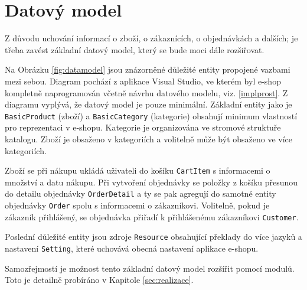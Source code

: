 \documentclass[11pt,twoside,a4paper]{book}
\begin{document}
\section{Datový model}

Z důvodu uchování informací o zboží, o zákaznících, o objednávkách a dalších; je třeba zavést základní datový model, který se bude moci dále rozšiřovat.

Na Obrázku \ref{fig:datamodel} jsou znázorněné důležité entity propojené vazbami mezi sebou. Diagram pochází z aplikace Visual Studio, ve kterém byl e-shop kompletně naprogramován včetně návrhu datového modelu, viz. \ref{implprost}. Z diagramu vyplývá, že datový model je pouze minimální. Základní entity jako je  \texttt{BasicProduct} (zboží) a \texttt{BasicCategory} (kategorie) obsahují minimum vlastností pro reprezentaci v e-shopu. Kategorie je organizována ve stromové struktuře katalogu. Zboží je obsaženo v kategoriích a volitelně může být obsaženo ve více kategoriích.
	
Zboží se při nákupu ukládá uživateli do košíku \texttt{CartItem} s informacemi o množství a datu nákupu. Při vytvoření objednávky se položky z košíku přesunou do detailu objednávky \texttt{OrderDetail} a ty se pak agregují do samotné entity objednávky \texttt{Order} spolu s informacemi o zákazníkovi. Volitelně, pokud je zákazník přihlášený, se objednávka přiřadí k přihlášenému zákazníkovi \texttt{Customer}. 
	
Poslední důležité entity jsou zdroje \texttt{Resource} obsahující překlady do více jazyků a nastavení \texttt{Setting}, které uchovává obecná nastavení aplikace e-shopu.

	Samozřejmostí je možnost tento základní datový model rozšířit pomocí modulů. Toto je detailně probíráno v Kapitole \ref{sec:realizace}.
	
\end{document}

